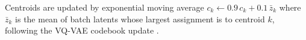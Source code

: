 \documentclass[11pt]{article}
\begin{document}
Centroids are updated by exponential moving average $c_k \leftarrow 0.9\,c_k + 0.1\,\bar{z}_k$ where \(\bar{z}_k\) is the mean of batch latents whose largest assignment is to centroid \(k\), following the VQ-VAE codebook update \citep{vandenoord2017vqvae}.








\end{document}
